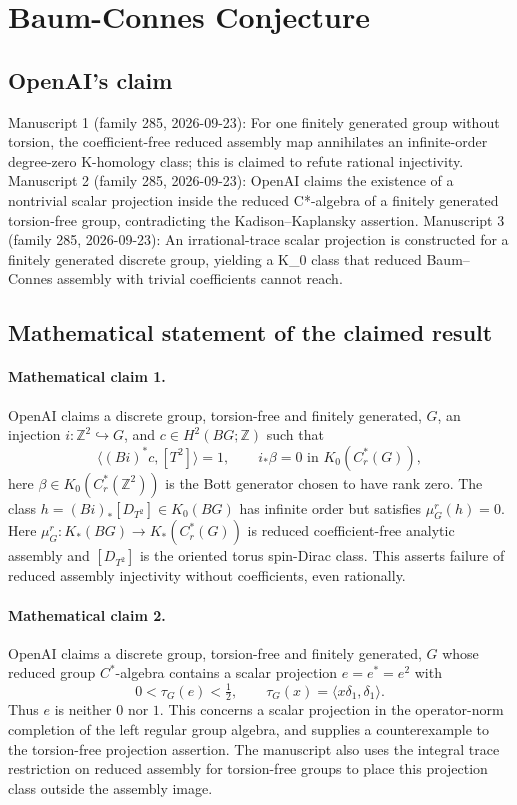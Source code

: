 \documentclass[11pt]{article}
\begin{document}
\section*{Baum-Connes Conjecture}

\subsection{OpenAI's claim}
Manuscript 1 (family 285, 2026-09-23): For one finitely generated group without torsion, the coefficient-free reduced assembly map annihilates an infinite-order degree-zero K-homology class; this is claimed to refute rational injectivity. Manuscript 2 (family 285, 2026-09-23): OpenAI claims the existence of a nontrivial scalar projection inside the reduced C*-algebra of a finitely generated torsion-free group, contradicting the Kadison--Kaplansky assertion. Manuscript 3 (family 285, 2026-09-23): An irrational-trace scalar projection is constructed for a finitely generated discrete group, yielding a K\_0 class that reduced Baum--Connes assembly with trivial coefficients cannot reach.

\subsection{Mathematical statement of the claimed result}
\paragraph{Mathematical claim 1.} OpenAI claims a discrete group, torsion-free and finitely generated, $G$, an injection $i:\mathbb Z^2\hookrightarrow G$, and $c\in H^2(BG;\mathbb Z)$ such that
\[
\langle(Bi)^*c,[T^2]\rangle=1,\qquad
 i_*\beta=0\text{ in }K_0(C_r^*(G)),
\]
here $\beta\in K_0(C_r^*(\mathbb Z^2))$ is the Bott generator chosen to have rank zero. The class $h=(Bi)_*[D_{T^2}]\in K_0(BG)$ has infinite order but satisfies $\mu_G^r(h)=0$. Here $\mu_G^r:K_*(BG)\to K_*(C_r^*(G))$ is reduced coefficient-free analytic assembly and $[D_{T^2}]$ is the oriented torus spin-Dirac class. This asserts failure of reduced assembly injectivity without coefficients, even rationally.

\paragraph{Mathematical claim 2.} OpenAI claims a discrete group, torsion-free and finitely generated, $G$ whose reduced group $C^*$-algebra contains a scalar projection $e=e^*=e^2$ with
\[
0<\tau_G(e)<\tfrac12,\qquad\tau_G(x)=\langle x\delta_1,\delta_1\rangle.
\]
Thus $e$ is neither $0$ nor $1$. This concerns a scalar projection in the operator-norm completion of the left regular group algebra, and supplies a counterexample to the torsion-free projection assertion. The manuscript also uses the integral trace restriction on reduced assembly for torsion-free groups to place this projection class outside the assembly image.
\end{document}
